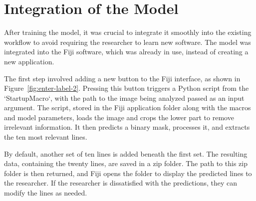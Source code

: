\section{Integration of the Model}\label{sec:integ}

After training the model, it was crucial to integrate it smoothly into the existing workflow to avoid requiring the researcher to learn new software. The model was integrated into the Fiji software, which was already in use, instead of creating a new application.

The first step involved adding a new button to the Fiji interface, as shown in Figure~\ref{fig:enter-label-2}. Pressing this button triggers a Python script from the `StartupMacro`, with the path to the image being analyzed passed as an input argument. The script, stored in the Fiji application folder along with the macros and model parameters, loads the image and crops the lower part to remove irrelevant information. It then predicts a binary mask, processes it, and extracts the ten most relevant lines.

By default, another set of ten lines is added beneath the first set. The resulting data, containing the twenty lines, are saved in a zip folder. The path to this zip folder is then returned, and Fiji opens the folder to display the predicted lines to the researcher. If the researcher is dissatisfied with the predictions, they can modify the lines as needed.

